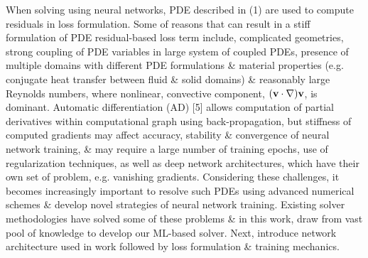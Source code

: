 \documentclass{article}
\begin{document}
\begin{itemize}
	When solving using neural networks, PDE described in (1) are used to compute residuals in loss formulation. Some of reasons that can result in a stiff formulation of PDE residual-based loss term include, complicated geometries, strong coupling of PDE variables in large system of coupled PDEs, presence of multiple domains with different PDE formulations \& material properties (e.g. conjugate heat transfer between fluid \& solid domains) \& reasonably large Reynolds numbers, where nonlinear, convective component, $({\bf v}\cdot\nabla){\bf v}$, is dominant. Automatic differentiation (AD) [5] allows computation of partial derivatives within computational graph using back-propagation, but stiffness of computed gradients may affect accuracy, stability \& convergence of neural network training, \& may require a large number of training epochs, use of regularization techniques, as well as deep network architectures, which have their own set of problem, e.g. vanishing gradients. Considering these challenges, it becomes increasingly important to resolve such PDEs using advanced numerical schemes \& develop novel strategies of neural network training. Existing solver methodologies have solved some of these problems \& in this work, draw from vast pool of knowledge to develop our ML-based solver. Next, introduce network architecture used in work followed by loss formulation \& training mechanics.
	\begin{itemize}

\end{itemize}
\end{itemize}
\end{document}
